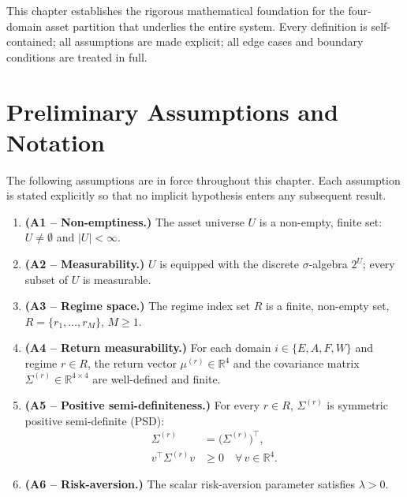 \documentclass[12pt,openany]{book}
\newcommand{\R}{\mathbb{R}}
\newcommand{\calU}{\mathcal{U}}
\numberwithin{equation}{chapter}
\theoremstyle{plain}
\theoremstyle{definition}
\theoremstyle{remark}
\numberwithin{equation}{chapter}
\theoremstyle{plain}
\newcommand{\calR}{\mathcal{R}}
\def\calR{R}%
\def\calU{U}%
\begin{document}
\noindent This chapter establishes the rigorous mathematical foundation for
the four-domain asset partition that underlies the entire system.  Every
definition is self-contained; all assumptions are made explicit; all edge
cases and boundary conditions are treated in full.

\section{Preliminary Assumptions and Notation}
\label{sec:four-domain-prelim}

\noindent The following assumptions are in force throughout this chapter.
Each assumption is stated explicitly so that no implicit hypothesis enters
any subsequent result.

\begin{enumerate}
  \item \textbf{(A1 -- Non-emptiness.)}
        The asset universe $\calU$ is a non-empty, finite set:
        $\calU \neq \emptyset$ and $|\calU| < \infty$.

  \item \textbf{(A2 -- Measurability.)}
        $\calU$ is equipped with the discrete $\sigma$-algebra
        $2^{\calU}$; every subset of $\calU$ is measurable.

  \item \textbf{(A3 -- Regime space.)}
        The regime index set $\calR$ is a finite, non-empty set,
        $\calR = \{r_1, \ldots, r_M\}$, $M \geq 1$.

  \item \textbf{(A4 -- Return measurability.)}
        For each domain $i \in \{E,A,F,W\}$ and regime $r \in \calR$,
        the return vector $\mu^{(r)} \in \R^4$ and the covariance matrix
        $\Sigma^{(r)} \in \R^{4 \times 4}$ are well-defined and finite.

  \item \textbf{(A5 -- Positive semi-definiteness.)}
        For every $r \in \calR$, $\Sigma^{(r)}$ is symmetric positive
        semi-definite (PSD):
        \begin{align}
          \Sigma^{(r)} &= \bigl(\Sigma^{(r)}\bigr)^\top,
          \label{eq:sigma-sym} \\
          v^\top \Sigma^{(r)} v &\geq 0
          \quad \forall\, v \in \R^4.
          \label{eq:sigma-psd}
        \end{align}

  \item \textbf{(A6 -- Risk-aversion.)}
        The scalar risk-aversion parameter satisfies $\lambda > 0$.
\end{enumerate}
\end{document}
